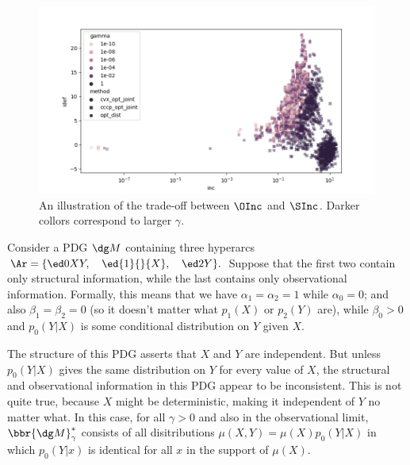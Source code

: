 \fi
\begin{example}
\label{sec:example-gamma}

\begin{figure}
    \includegraphics[width=\linewidth]{figs/inc-idef2}
    \caption{An illustration of the trade-off between $\OInc$ and $\SInc_{}$. Darker collors correspond to larger $\gamma$.}\label{fig:inc-idef}
\end{figure}

Consider a PDG $\dg M$ containing three
hyperarcs 
$
    \Ar = \{ \ed0XY, \quad \ed{1}{}{X}, \quad \ed2{}Y  \}.
$
Suppose that the first two contain only structural information, 
while the last contains only observational information. 
Formally, this means that we have $\alpha_1 = \alpha_2 = 1$ while $\alpha_0 = 0$;
and also $\beta_1 = \beta_2 = 0$ (so it doesn't matter what $p_1(X)$ or $p_2(Y)$ are), while $\beta_0 > 0$ and $p_0(Y|X)$ is some conditional distribution on $Y$ given $X$. 

The structure of this PDG asserts that $X$ and $Y$ are independent.
But unless $p_0(Y|X)$ gives the same distribution on $Y$ for every value of $X$, the structural and observational information in this PDG appear to be inconsistent.
This is not quite true, because $X$ might be deterministic, making it independent of $Y$ no matter what. 
In this case, for all $\gamma > 0$ and also in the observational limit, 
$\bbr{\dg M}^*_\gamma$ consists of all disitributions $\mu(X,Y) = \mu(X)p_0(Y|X)$ in which
$p_0(Y|x)$ is identical for all $x$ in the support of $\mu(X)$.


\end{example}
